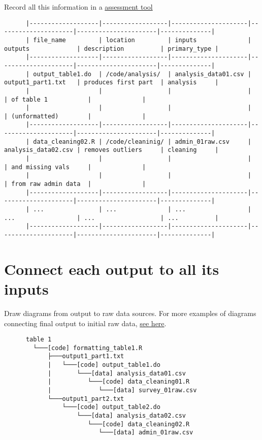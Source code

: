 \documentclass[]{book}
\begin{document}
Record all this information in a \href{https://docs.google.com/spreadsheets/d/1LUIdVFH0OfR70C7z07TYeE-uWzKI_JIeWUMaYhqEKK0/edit\#gid=1617799822\&range=A1}{assessment tool}

\begin{verbatim}
      |-------------------|------------------|---------------------|---------------------|----------------------|--------------|
      | file_name         | location         | inputs              | outputs             | description          | primary_type |
      |-------------------|------------------|---------------------|---------------------|----------------------|--------------|
      | output_table1.do  | /code/analysis/  | analysis_data01.csv | output1_part1.txt   | produces first part  | analysis     |
      |                   |                  |                     |                     | of table 1           |              |
      |                   |                  |                     |                     | (unformatted)        |              |
      |-------------------|------------------|---------------------|---------------------|----------------------|--------------|
      | data_cleaning02.R | /code/cleaninig/ | admin_01raw.csv     | analysis_data02.csv | removes outliers     | cleaning     |
      |                   |                  |                     |                     | and missing vals     |              |
      |                   |                  |                     |                     | from raw admin data  |              |
      |-------------------|------------------|---------------------|---------------------|----------------------|--------------|
      | ...               | ...              | ...                 | ...                 | ...                  | ...          |
      |-------------------|------------------|---------------------|---------------------|----------------------|--------------|
\end{verbatim}

\hypertarget{diagram}{%
\section{Connect each output to all its inputs}\label{diagram}}

Draw diagrams from output to raw data sources. For more examples of diagrams connecting final output to initial raw data, \protect\hyperlink{additional-diagrams}{see here}.

\begin{verbatim}
      table 1
        └───[code] formatting_table1.R
            ├───output1_part1.txt  
            |   └───[code] output_table1.do           
            |       └───[data] analysis_data01.csv
            |          └───[code] data_cleaning01.R
            |             └───[data] survey_01raw.csv
            └───output1_part2.txt  
                └───[code] output_table2.do           
                    └───[data] analysis_data02.csv
                       └───[code] data_cleaning02.R
                          └───[data] admin_01raw.csv  
\end{verbatim}
\end{document}
